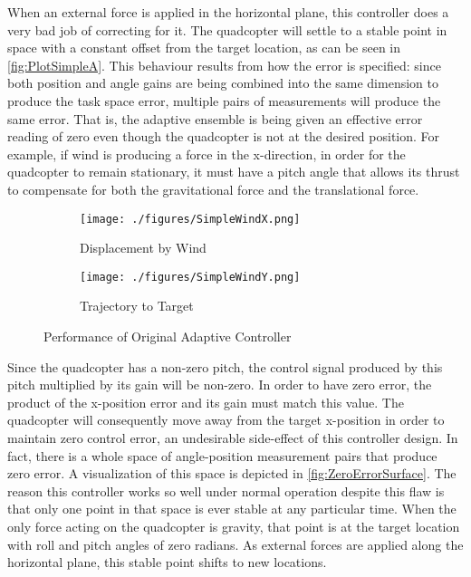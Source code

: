 \documentclass[letterpaper,12pt,titlepage,oneside,final]{book}
\begin{document}
When an external force is applied in the horizontal plane, this controller does a very bad job of correcting for it. 
The quadcopter will settle to a stable point in space with a constant offset from the target location, as can be seen in \autoref{fig:PlotSimpleA}. 
This behaviour results from how the error is specified:
since both position and angle gains are being combined into the same dimension to produce the task space error, multiple pairs of measurements will produce the same error. 
That is, the adaptive ensemble is being given an effective error reading of zero even though the quadcopter is not at the desired position. 
For example, if wind is producing a force in the x-direction, in order for the quadcopter to remain stationary, it must have a pitch angle that allows its thrust to compensate for both the gravitational force and the translational force.

\begin{figure} %
\centering
\begin{subfigure}[t]{0.48\textwidth}
\texttt{[image: ./figures/SimpleWindX.png]} %
\caption{Displacement by Wind}
\label{fig:PlotSimpleA}
\end{subfigure}
\begin{subfigure}[t]{0.48\textwidth}
\texttt{[image: ./figures/SimpleWindY.png]}
\caption{Trajectory to Target}
\label{fig:PlotSimpleB}
\end{subfigure}
\caption{Performance of Original Adaptive Controller}
\label{fig:PlotSimple}
\end{figure}


Since the quadcopter has a non-zero pitch, the control signal produced by this pitch multiplied by its gain will be non-zero. 
In order to have zero error, the product of the x-position error and its gain must match this value. 
The quadcopter will consequently move away from the target x-position in order to maintain zero control error, an undesirable side-effect of this controller design. 
In fact, there is a whole space of angle-position measurement pairs that produce zero error.
A visualization of this space is depicted in \autoref{fig:ZeroErrorSurface}. 
The reason this controller works so well under normal operation despite this flaw is that only one point in that space is ever stable at any particular time. 
When the only force acting on the quadcopter is gravity, that point is at the target location with roll and pitch angles of zero radians. 
As external forces are applied along the horizontal plane, this stable point shifts to new locations.
\end{document}
